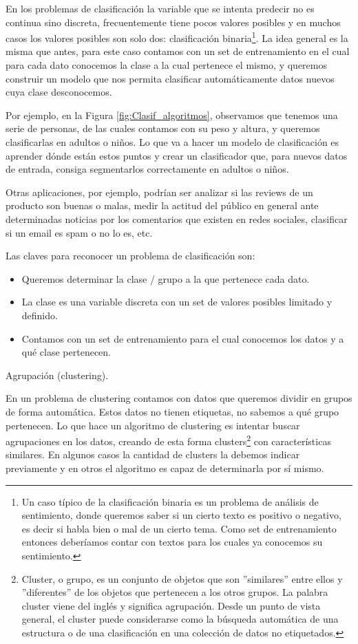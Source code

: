 \documentclass[12pt,a4paper]{article}
\makeatletter
\renewcommand\paragraph{\@startsection{paragraph}{4}{\z@}
            {-2.5ex\@plus -1ex \@minus -.25ex}
            {1.25ex \@plus .25ex}
            {\normalfont\normalsize\bfseries}}
\makeatother
\begin{document}
\begin{sloppypar}
En los problemas de clasificación la variable que se intenta predecir no es continua sino discreta, frecuentemente tiene pocos valores posibles y en muchos casos los valores posibles son solo dos: clasificación binaria\footnote{Un caso típico de la clasificación binaria es un problema de análisis de sentimiento, donde queremos saber si un cierto texto es positivo o negativo, es decir si habla bien o mal de un cierto tema. Como set de entrenamiento entonces deberíamos contar con textos para los cuales ya conocemos su sentimiento.}. La idea general es la misma que antes, para este caso contamos con un set de entrenamiento en el cual para cada dato conocemos la clase a la cual pertenece el mismo, y queremos construir un modelo que nos permita clasificar automáticamente datos nuevos cuya clase desconocemos.

Por ejemplo, en la Figura \ref{fig:Clasif_algoritmos}, observamos que tenemos una serie de personas, de las cuales contamos con su peso y altura, y queremos clasificarlas en adultos o niños. Lo que va a hacer un modelo de clasificación es aprender dónde están estos puntos y crear un clasificador que, para nuevos datos de entrada, consiga segmentarlos correctamente en adultos o niños.

Otras aplicaciones, por ejemplo, podrían ser analizar si las reviews de un producto son buenas o malas, medir la actitud del público en general ante determinadas noticias por los comentarios que existen en redes sociales, clasificar si un email es spam o no lo es, etc. 

Las claves para reconocer un problema de clasificación\cite{apunte_uba} son:
\begin{itemize}
\item Queremos determinar la clase / grupo  a la que pertenece cada dato.
\item La clase es una variable discreta con un set de valores posibles limitado y definido.
\item Contamos con un set de entrenamiento para el cual conocemos los datos y a qué clase pertenecen.
\end{itemize}

\cleardoublepage
\paragraph{Agrupación (clustering).}\label{agrupacion}

En un problema de clustering contamos con datos que queremos dividir en grupos de forma automática. Estos datos no tienen etiquetas, no sabemos a qué grupo pertenecen. Lo que hace un algoritmo de clustering es intentar buscar agrupaciones en los datos, creando de esta forma clusters\footnote{Cluster, o grupo, es un conjunto de objetos que son ”similares” entre ellos y ”diferentes” de los objetos que pertenecen a los otros grupos. La palabra cluster viene del inglés y significa agrupación. Desde un punto de vista general, el cluster puede considerarse como la búsqueda automática de una estructura o de una clasificación en una colección de datos no etiquetados.} con características similares. En algunos casos la cantidad de clusters la debemos indicar previamente y en otros el algoritmo es capaz de determinarla por sí mismo.


\end{sloppypar}
\end{document}
